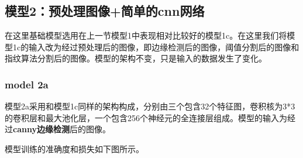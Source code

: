 \FloatBarrier
\subsection{模型2：预处理图像+简单的cnn网络}

在这里基础模型选用在上一节模型1中表现相对比较好的模型1c。在这里我们将模型1c的输入改为经过预处理后的图像，即边缘检测后的图像，阈值分割后的图像和指纹算法分割后的图像。模型的架构不变，只是输入的数据发生了变化。

\subsubsection{model 2a}

模型2a采用和模型1c同样的架构构成，分别由三个包含32个特征图，卷积核为3*3的卷积层和最大池化层，一个包含256个神经元的全连接层组成。模型的输入为经过\textbf{canny边缘检测}后的图像。

模型训练的准确度和损失如下图所示。


